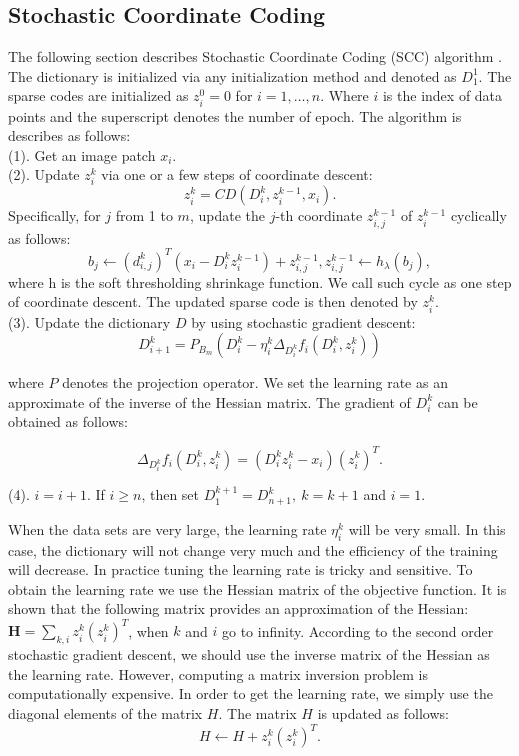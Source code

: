 \documentclass[authoryear,preprint,revi	ew,12pt]{elsarticle}
\begin{document}
\subsection{\textbf{Stochastic Coordinate Coding}}
\label{sec:app:SCC}
The following section describes Stochastic Coordinate Coding (SCC) algorithm \citep{lin2014stochastic}. The dictionary is initialized via any initialization method and denoted as $ D_1^1 $. The sparse codes are initialized as $ z_i^0 = 0 $ for $ i=1,\dots,n $. Where $ i $ is the index of data points and the superscript denotes the number of epoch. The algorithm is describes as follows:\\
(1). Get an image patch $ x_i $.\\
(2). Update $ z_i^k $ via one or a few steps of coordinate descent: 
\begin{equation}
z^k_i = CD(D^k_i,z^{k-1}_i,x_i).
\end{equation}
Specifically, for $ j $ from 1 to $ m $, update the $ j $-th coordinate $ z_{i,j}^{k-1} $ of $ z_{i}^{k-1} $ cyclically as follows:
\begin{equation}
b_j \gets (d_{i,j}^k)^T (x_i - D_i^kz^{k-1}_i) + z^{k-1}_{i,j}, z_{i,j}^{k-1} \gets h_{\lambda}(b_j),
\end{equation}	
where h is the soft thresholding shrinkage function. We call such cycle as one step of coordinate descent. The updated sparse code is then denoted by $ z_i^k $. \\
(3). Update the dictionary $ D $ by using stochastic gradient descent:
\begin{equation}
D_{i+1}^k = P_{B_m}(D_i^k - \eta^k_i\Delta_{D_i^k} f_i(D_i^k,z^k_i))
\end{equation}

where $ P $ denotes the projection operator. We set the learning rate as an approximate of the inverse of the Hessian matrix. The gradient of $ D_i^k $ can be obtained as follows:

\begin{equation}
\Delta_{D_i^k} f_i (D_i^k, z_i^k) = (D^k_iz^k_i - x_i)(z^k_i)^T.
\end{equation}

(4). $ i = i+1 $. If $ i \ge n $, then set $ D_1^{k+1} = D^k_{n+1}, ~k=k+1$ and $ i = 1 $.

When the data sets are very large, the learning rate $ \eta^k_i $ will be very small. In this case, the dictionary will not change very much and the efficiency of the training will decrease. In practice tuning the learning rate is tricky and sensitive. To obtain the learning rate we use the Hessian matrix of the objective function. It is shown that the following matrix provides an approximation of the Hessian: $ \mathbf{H} = \sum_{k,i} z^k_i(z^k_i)^T $, when $ k $ and $ i $ go to infinity. According to the second order stochastic gradient descent, we should use the inverse matrix of the Hessian as the learning rate. However, computing a matrix inversion problem is computationally expensive. In order to get the learning rate, we simply use the diagonal elements of the matrix $ H $. The matrix $ H $ is updated as follows:
\begin{equation}
	H \gets H + z^k_i(z^k_i)^T.
\end{equation}
\end{document}
